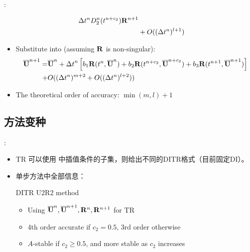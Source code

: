 \documentclass[aspectratio=169,serif]{beamer} %
\begin{document}
\begin{frame}[allowframebreaks]{\secname: \subsecname}
\begin{itemize}
\begin{equation}
\begin{aligned}
              {\Delta} t^n D^n_2(t^{n+c_2})\mathbf{R}^{n + 1}
              \\ & +
              O(({\Delta} t^{n})^{l+1} )
            \end{aligned}
          \end{equation}
    \item Substitute  into  (assuming $\mathbf{R}$ is non-singular):
          \begin{equation}
            \begin{aligned}
              \overline{\mathbf{U}}^{n+1}
              = &
              \overline{\mathbf{U}}^{n} + {{\Delta} t}^{n}
              \left[
                b_1\mathbf{R}(t^n, \overline{\mathbf{U}}^n)
                +
                b_2\mathbf{R}(t^{n+c_2}, \overline{\mathbf{U}}^{n+c_2})
                +
                b_3\mathbf{R}(t^{n+1}, \overline{\mathbf{U}}^{n+1})
                \right]
              \\ + &
              O(({\Delta} t^{n})^{m+2}  + O(({\Delta} t^{n})^{l+2} ))
            \end{aligned}
            \label{eq:fullLTE}
          \end{equation}
    \item The theoretical order of accuracy: $\min(m,l) + 1$
  \end{itemize}
\end{frame}


\subsection{方法变种}

\begin{frame}{\secname: \subsecname}
  \begin{itemize}
    \item TR 可以使用  中插值条件的子集，则给出不同的DITR格式（目前固定DI）。
    \item 单步方法中全部信息：
          \begin{block}{DITR U2R2 method}
            \begin{itemize}
              \item Using $\overline{\mathbf{U}}^{n},\overline{\mathbf{U}}^{n+1},\mathbf{R}^{n},\mathbf{R}^{n+1}$ for TR
              \item 4th order accurate if $c_2=0.5$, 3rd order otherwise
              \item $A$-stable if $c_2 \geq 0.5$, and more stable as $c_2$ increases
            \end{itemize}
          \end{block}
  \end{itemize}
\end{frame}
\end{document}
